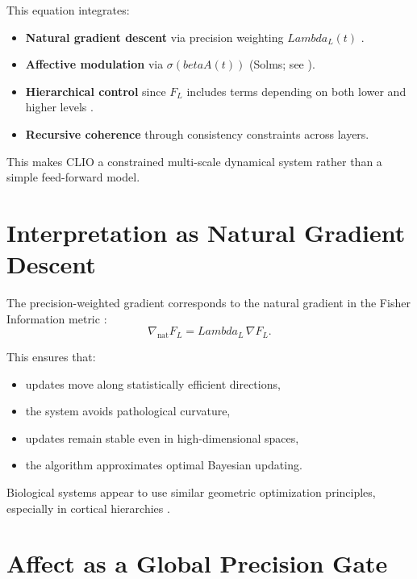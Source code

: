 \documentclass[12pt,oneside]{book}
\theoremstyle{plain}
\theoremstyle{definition}
\let\citep\parencite
\def\beta{beta}%
\def\Lambda{Lambda}%
\begin{document}
This equation integrates:

\begin{itemize}
    \item \textbf{Natural gradient descent}
    via precision weighting $\Lambda_L(t)$
    \citep{amari1998natural,amari2016information}.

    \item \textbf{Affective modulation}
    via $\sigma(\beta A(t))$ (Solms; see \citealp{solms2021hidden}).

    \item \textbf{Hierarchical control}
    since $F_L$ includes terms depending on both lower and higher levels
    \citep{friston2017active}.

    \item \textbf{Recursive coherence}
    through consistency constraints across layers.
\end{itemize}

This makes CLIO a constrained multi-scale dynamical system rather than a simple
feed-forward model.

\section{Interpretation as Natural Gradient Descent}

The precision-weighted gradient corresponds to the natural gradient in the
Fisher Information metric \citep{amari1998natural}:
\[
\nabla_{\mathrm{nat}} F_L = \Lambda_L \, \nabla F_L.
\]

This ensures that:

\begin{itemize}
    \item updates move along statistically efficient directions,
    \item the system avoids pathological curvature,
    \item updates remain stable even in high-dimensional spaces,
    \item the algorithm approximates optimal Bayesian updating.
\end{itemize}

Biological systems appear to use similar geometric optimization principles,
especially in cortical hierarchies \citep{bogacz2017tutorial}.

\section{Affect as a Global Precision Gate}
\end{document}

